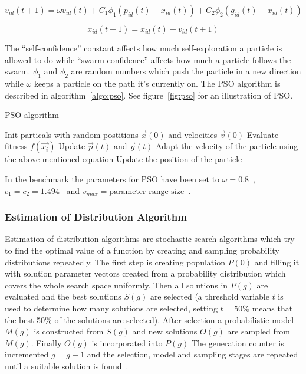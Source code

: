 \begin{equation}
  v_{id} (t+1) = \omega v_{id} (t) + C_1 \phi_1 (p_{id} (t) - x_{id} (t)) + C_2 \phi_2 (g_{id} (t) - x_{id} (t))
\end{equation}

\begin{equation}
  x_{id} (t+1) = x_{id} (t) + v_{id} (t+1)
\end{equation}

The “self-confidence” constant affects how much self-exploration a particle is allowed to do while “swarm-confidence” affects how much a particle follows the swarm. $\phi_1$ and $\phi_2$ are random numbers which push the particle in a new direction while $\omega$ keeps a particle on the path it’s currently on. The PSO algorithm is described in algorithm~\ref{algo:pso}. See figure~\ref{fig:pso} for an illustration of PSO.

\begin{algorithm}[h]
  \caption{PSO algorithm}
  \label{algo:pso}
    \begin{algorithmic}
      \State Init particals with random postitions
      $\vec{x}(0)$ and velocities $\vec{v}(0)$
      \Repeat
          \State Evaluate fitness $f(\vec{x_i})$
          \State Update $\vec{p}(t)$ and $\vec{g}(t)$
          \State Adapt the velocity of the particle using the above-mentioned equation
          \State Update the position of the particle
        \EndFor
    \end{algorithmic}
\end{algorithm}



In the benchmark the parameters for PSO have been set to $\omega = 0.8$~\cite{shi1998modified}, $c_1 = c_2 = 1.494$~\cite{kennedy1999small} and $v_{max} = \text{parameter range size}$~\cite{Das2008}.

\subsubsection{Estimation of Distribution Algorithm}

Estimation of distribution algorithms are stochastic search algorithms which try to find the optimal value of a function by creating and sampling probability distributions repeatedly. The first step is creating population $P(0)$ and filling it with solution parameter vectors created from a probability distribution which covers the whole search space uniformly. Then all solutions in $P(g)$ are evaluated and the best solutions $S(g)$ are selected (a threshold variable $t$ is used to determine how many solutions are selected, setting $t=50\%$ means that the best 50\% of the solutions are selected). After selection a probabilistic model $M(g)$ is constructed from $S(g)$ and new solutions $O(g)$ are sampled from $M(g)$. Finally $O(g)$ is incorporated into $P(g)$ The generation counter is incremented $g = g + 1$ and the selection, model and sampling stages are repeated until a suitable solution is found~\cite{Hauschild2011111}.

